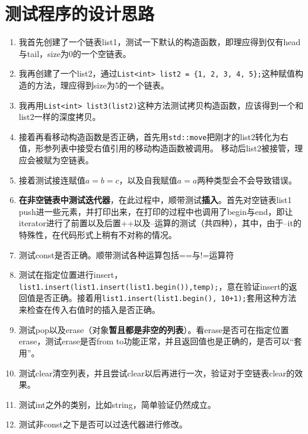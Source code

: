 \documentclass[UTF8]{ctexart}
\begin{document}
\pagestyle{fancy}
\fancyhead{}

\section{测试程序的设计思路}



\begin{enumerate}

    \item 我首先创建了一个链表list1，测试一下默认的构造函数，即理应得到仅有head与tail，size为0的一个空链表。

    \item  我再创建了一个list2，通过\texttt{List<int> list2 = \{1, 2, 3, 4, 5\};}这种赋值构造的方法，理应得到size为5的一个链表。

    \item 我再用\texttt{List<int> list3(list2)}这种方法测试拷贝构造函数，应该得到一个和list2一样的深度拷贝。

    \item 接着再看移动构造函数是否正确，首先用\texttt{std::move}把刚才的list2转化为右值，形参列表中接受右值引用的移动构造函数被调用。
    移动后list2被接管，理应会被赋为空链表。

    \item 接着测试接连赋值$a=b=c$，以及自我赋值$a=a$两种类型会不会导致错误。

    \item \textbf{在非空链表中测试迭代器}，在此过程中，顺带测试\textbf{插入}。首先对空链表list1 push进一些元素，并打印出来，在打印的过程中也调用了begin与end，即让iterator进行了前置以及后置++以及--运算的测试（共四种），其中，由于--it的特殊性，在代码形式上稍有不对称的情况。

    \item 测试const是否正确。顺带测试各种运算包括==与!=运算符

    \item 测试在指定位置进行insert，\texttt{list1.insert(list1.insert(list1.begin()),temp);}，意在验证insert的返回值是否正确。接着用\texttt{list1.insert(list1.begin(), 10+1);}套用这种方法来检查在传入右值时的插入是否正确。

    \item 测试pop以及erase（对象\textbf{暂且都是非空的列表}）。看erase是否可在指定位置erase，测试erase是否from to功能正常，并且返回值也是正确的，是否可以“套用”。

    \item 测试clear清空列表，并且尝试clear以后再进行一次，验证对于空链表clear的效果。

    \item 测试int之外的类别，比如string，简单验证仍然成立。

    \item 测试非const之下是否可以过迭代器进行修改。

\end{enumerate}
\end{document}
